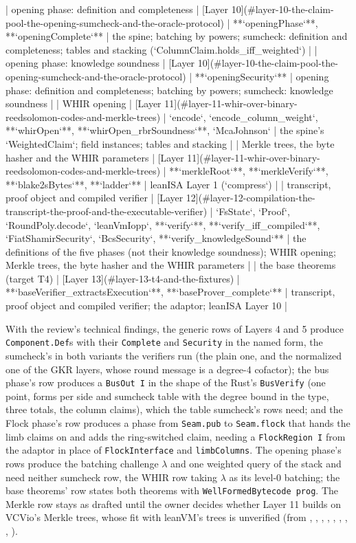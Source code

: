 \begin{srccode}
| opening phase: definition and completeness | [Layer 10](#layer-10-the-claim-pool-the-opening-sumcheck-and-the-oracle-protocol) | **`openingPhase`**, **`openingComplete`** | the spine; batching by powers; sumcheck: definition and completeness; tables and stacking (`ColumnClaim.holds_iff_weighted`) |
| opening phase: knowledge soundness | [Layer 10](#layer-10-the-claim-pool-the-opening-sumcheck-and-the-oracle-protocol) | **`openingSecurity`** | opening phase: definition and completeness; batching by powers; sumcheck: knowledge soundness |
| WHIR opening | [Layer 11](#layer-11-whir-over-binary-reedsolomon-codes-and-merkle-trees) | `encode`, `encode_column_weight`, **`whirOpen`**, **`whirOpen_rbrSoundness`**, `McaJohnson` | the spine's `WeightedClaim`; field instances; tables and stacking |
| Merkle trees, the byte hasher and the WHIR parameters | [Layer 11](#layer-11-whir-over-binary-reedsolomon-codes-and-merkle-trees) | **`merkleRoot`**, **`merkleVerify`**, **`blake2sBytes`**, **`ladder`** | leanISA Layer 1 (`compress`) |
| transcript, proof object and compiled verifier | [Layer 12](#layer-12-compilation-the-transcript-the-proof-and-the-executable-verifier) | `FsState`, `Proof`, `RoundPoly.decode`, `leanVmIopp`, **`verify`**, **`verify_iff_compiled`**, `FiatShamirSecurity`, `BcsSecurity`, **`verify_knowledgeSound`** | the definitions of the five phases (not their knowledge soundness); WHIR opening; Merkle trees, the byte hasher and the WHIR parameters |
| the base theorems (target T4) | [Layer 13](#layer-13-t4-and-the-fixtures) | **`baseVerifier_extractsExecution`**, **`baseProver_complete`** | transcript, proof object and compiled verifier; the adaptor; leanISA Layer 10 |
\end{srccode}

\begin{sloppypar}
With the review's technical findings, the generic rows of Layers 4 and 5 produce \texttt{Component.\allowbreak{}Def}s with their \texttt{Complete} and \texttt{Security} in the named form, the sumcheck's in both variants the verifiers run (the plain one, and the normalized one of the GKR layers, whose round message is a degree-4 cofactor); the bus phase's row produces a \texttt{BusOut I} in the shape of the Rust's \texttt{BusVerify} (one point, forms per side and sumcheck table with the degree bound in the type, three totals, the column claims), which the table sumcheck's rows need; and the Flock phase's row produces a phase from \texttt{Seam.\allowbreak{}pub} to \texttt{Seam.\allowbreak{}flock} that hands the limb claims on and adds the ring-switched claim, needing a \texttt{FlockRegion I} from the adaptor in place of \texttt{FlockInterface} and \texttt{limbColumns}. The opening phase's rows produce the batching challenge $λ$ and one weighted query of the stack and need neither sumcheck row, the WHIR row taking $λ$ as its level-0 batching; the base theorems' row states both theorems with \texttt{Well\allowbreak{}Formed\allowbreak{}Bytecode prog}. The Merkle row stays as drafted until the owner decides whether Layer 11 builds on VCVio's Merkle trees, whose fit with leanVM's trees is unverified (from , , , , , , , , ).
\end{sloppypar}

